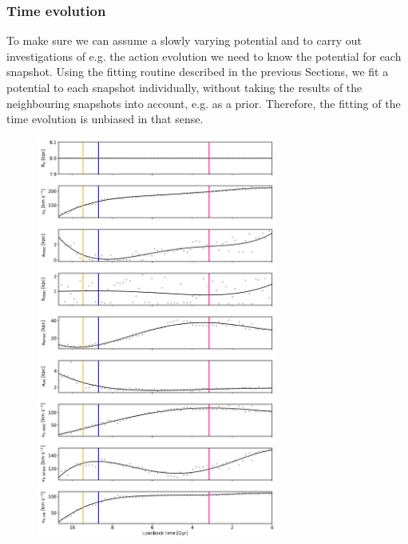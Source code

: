 \subsubsection{Time evolution}
To make sure we can assume a slowly varying potential and to carry out investigations of e.g. the action evolution we need to know the potential for each snapshot. Using the fitting routine described in the previous Sections, we fit a potential to each snapshot individually, without taking the results of the neighbouring snapshots into account, e.g. as a prior. Therefore, the fitting of the time evolution is unbiased in that sense. 
\begin{figure}%
\captionsetup{format=plain}
\centering
\includegraphics[width=0.7\textwidth]{plots/Auriga/fitted_potential_evolution_jan19.png}

\end{figure}
